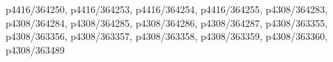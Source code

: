 p4416/364250, p4416/364253, p4416/364254, p4416/364255, p4308/364283, p4308/364284, p4308/364285,
p4308/364286, p4308/364287, p4308/363355, p4308/363356, p4308/363357, p4308/363358, p4308/363359,
p4308/363360, p4308/363489
